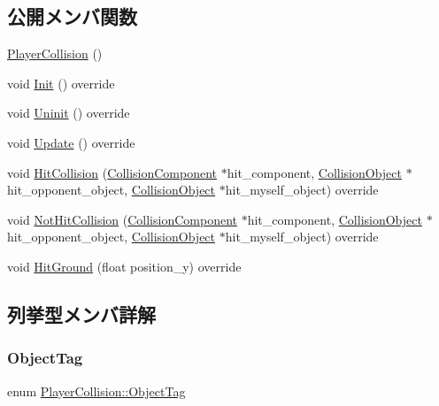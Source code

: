 \subsection*{公開メンバ関数}
\begin{DoxyCompactItemize}
\item 
\mbox{\hyperlink{class_player_collision_a60f6ed3a1886aa80dcd23cb499284470}{Player\+Collision}} ()
\item 
void \mbox{\hyperlink{class_player_collision_a3dd6238b75933fd60aee77e92353cc44}{Init}} () override
\item 
void \mbox{\hyperlink{class_player_collision_aa1ab60a62fa2ae3231a1ea0bc8faf801}{Uninit}} () override
\item 
void \mbox{\hyperlink{class_player_collision_a09f97f220903f5724a3af6b97af3a336}{Update}} () override
\item 
void \mbox{\hyperlink{class_player_collision_ae2d429a16bf2c3ee74070ef497a8696a}{Hit\+Collision}} (\mbox{\hyperlink{class_collision_component}{Collision\+Component}} $\ast$hit\+\_\+component, \mbox{\hyperlink{class_collision_object}{Collision\+Object}} $\ast$hit\+\_\+opponent\+\_\+object, \mbox{\hyperlink{class_collision_object}{Collision\+Object}} $\ast$hit\+\_\+myself\+\_\+object) override
\item 
void \mbox{\hyperlink{class_player_collision_a46961b740806b7c467bb3384ff784b91}{Not\+Hit\+Collision}} (\mbox{\hyperlink{class_collision_component}{Collision\+Component}} $\ast$hit\+\_\+component, \mbox{\hyperlink{class_collision_object}{Collision\+Object}} $\ast$hit\+\_\+opponent\+\_\+object, \mbox{\hyperlink{class_collision_object}{Collision\+Object}} $\ast$hit\+\_\+myself\+\_\+object) override
\item 
void \mbox{\hyperlink{class_player_collision_a3522ce17b1e1752f2737c2243582ecb0}{Hit\+Ground}} (float position\+\_\+y) override
\end{DoxyCompactItemize}


\subsection{列挙型メンバ詳解}
\mbox{\label{class_player_collision_a628e8898ff4fc1f85eb4ba44eb0a6907}} 
\subsubsection{\texorpdfstring{Object\+Tag}{ObjectTag}}
{\footnotesize\ttfamily enum \mbox{\hyperlink{class_player_collision_a628e8898ff4fc1f85eb4ba44eb0a6907}{Player\+Collision\+::\+Object\+Tag}}}

